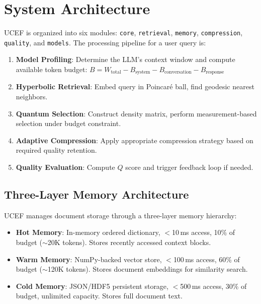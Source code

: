 \documentclass[11pt,a4paper]{article}
\newcommand{\ucef}{\textsf{UCEF}}
\begin{document}
\section{System Architecture}
\label{sec:architecture}

\ucef{} is organized into six modules: \texttt{core}, \texttt{retrieval},
\texttt{memory}, \texttt{compression}, \texttt{quality}, and \texttt{models}.
The processing pipeline for a user query is:
\begin{enumerate}
  \item \textbf{Model Profiling}: Determine the LLM's context window and
    compute available token budget:
    $B = W_{\text{total}} - B_{\text{system}} - B_{\text{conversation}}
    - B_{\text{response}}$
  \item \textbf{Hyperbolic Retrieval}: Embed query in Poincar\'{e} ball,
    find geodesic nearest neighbors.
  \item \textbf{Quantum Selection}: Construct density matrix, perform
    measurement-based selection under budget constraint.
  \item \textbf{Adaptive Compression}: Apply appropriate compression
    strategy based on required quality retention.
  \item \textbf{Quality Evaluation}: Compute $Q$ score and trigger
    feedback loop if needed.
\end{enumerate}

\subsection{Three-Layer Memory Architecture}

\ucef{} manages document storage through a three-layer memory hierarchy:

\begin{itemize}
  \item \textbf{Hot Memory}: In-memory ordered dictionary, $<$10\,ms access,
    10\% of budget ($\sim$20K tokens).  Stores recently accessed context
    blocks.
  \item \textbf{Warm Memory}: NumPy-backed vector store, $<$100\,ms access,
    60\% of budget ($\sim$120K tokens).  Stores document embeddings for
    similarity search.
  \item \textbf{Cold Memory}: JSON/HDF5 persistent storage, $<$500\,ms
    access, 30\% of budget, unlimited capacity.  Stores full document text.
\end{itemize}
\end{document}
